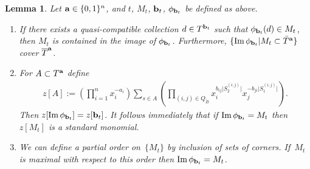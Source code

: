 \documentclass[pdftex]{sigma}
\numberwithin{equation}{section}
\newtheorem{Lemma}[Theorem]{Lemma}
\DeclareMathOperator{\Ima}{Im}
\begin{document}
\begin{Lemma}\label{lem:phi}
Let ${\bf a} \in \{0,1\}^n$, and $t$, $M_t$, ${\bf b}_t$, $\phi_{{\bf b}_t}$ be defined as above.
\begin{enumerate}\itemsep=0pt

\item[$1.$]  If there exists a quasi-compatible collection $d\in T^{{\bf b}_t}$ such that $\phi_{{\bf b}_t}(d) \in M_t$, then $M_t$ is contained in the image of $\phi_{{\bf b}_t}$. Furthermore, $ \{\Ima \phi_{{\bf b}_t} |M_t\subset \bar{T}^{\bf a}\}$ cover $\overline{T}^{\bf a}$.

\item[$2.$] For $A \subset T^{\bf a}$ define
\begin{gather*}
z[A] := \left(\prod_{i=1}^n  x_i^{-a_i}\right)
\sum _{s \in A}\left(\prod_{(i,j)\in Q_{\tilde B}}  x_{i}^{b_{ij} \big|S^{(i,j)}_2 \big|} x_{j}^{-b_{ji} \big|S^{(i,j)}_1 \big|}\right).
\end{gather*}
Then $z[\Ima \phi_{{\bf b}_t}]=z[{\bf b}_t]$. It follows immediately that if $\Ima \phi_{{\bf b}_t}=M_t$ then~$z[M_t]$ is a standard monomial.
\item[$3.$] We can define a partial order on~$\{ M_t\}$ by inclusion of sets of corners. If~$M_t$ is maximal with respect to this order then $\Ima \phi_{{\bf b}_t}=M_t$.
\end{enumerate}
\end{Lemma}
\end{document}
